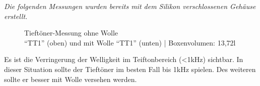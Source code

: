 \textit{Die folgenden Messungen wurden bereits mit dem Silikon verschlossenen Gehäuse erstellt.}\\
\begin{figure} [H]
	\centering
	\quad
	\caption{Tieftöner-Messung ohne Wolle\\ \enquote{TT1} (oben) und mit Wolle \enquote{TT1} (unten) | Boxenvolumen: 13,72l}
	\label{fig:5.3.4.1}
\end{figure}
Es ist die Verringerung der Welligkeit im Teiftonbereich (<1kHz) sichtbar.
In dieser Situation sollte der Tieftöner im besten Fall bis 1kHz spielen.
Des weiteren sollte er besser mit Wolle versehen werden.

